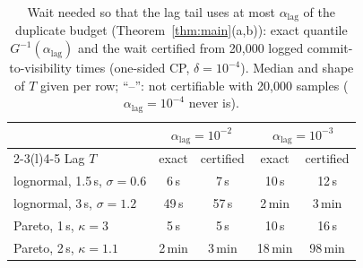 \begin{table}[!htbp]
\centering
\caption{Wait needed so that the lag tail uses at most $\alpha_{\mathrm{lag}}$ of the duplicate budget (Theorem~\ref{thm:main}(a,b)):
exact quantile $G^{-1}(\alpha_{\mathrm{lag}})$ and the wait certified from 20{,}000 logged commit-to-visibility times
(one-sided CP, $\delta{=}10^{-4}$). Median and shape of $T$ given per row; ``--'': not certifiable with 20{,}000 samples ($\alpha_{\mathrm{lag}}{=}10^{-4}$ never is).}
\label{tab:lag}
\footnotesize
\setlength{\tabcolsep}{3pt}
\begin{tabular}{@{}l cc cc@{}}
\toprule
 & \multicolumn{2}{c}{$\alpha_{\mathrm{lag}}{=}10^{-2}$} & \multicolumn{2}{c}{$\alpha_{\mathrm{lag}}{=}10^{-3}$} \\
\cmidrule(lr){2-3}\cmidrule(l){4-5}
Lag $T$ & exact & certified & exact & certified \\
\midrule
lognormal, 1.5\,s, $\sigma{=}0.6$ & 6\,s & 7\,s & 10\,s & 12\,s \\
lognormal, 3\,s, $\sigma{=}1.2$ & 49\,s & 57\,s & 2\,min & 3\,min \\
Pareto, 1\,s, $\kappa{=}3$ & 5\,s & 5\,s & 10\,s & 16\,s \\
Pareto, 2\,s, $\kappa{=}1.1$ & 2\,min & 3\,min & 18\,min & 98\,min \\
\bottomrule
\end{tabular}
\end{table}
